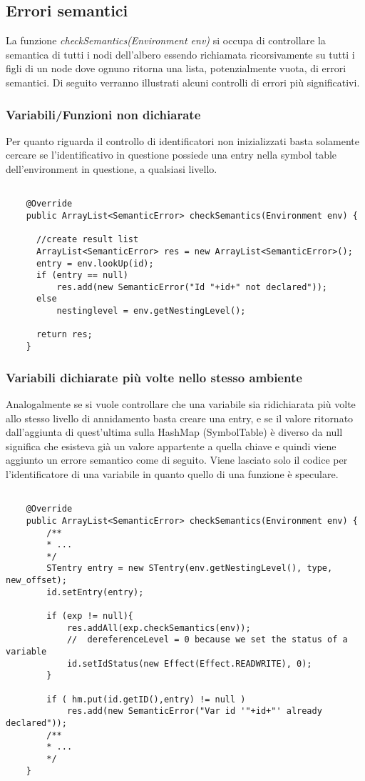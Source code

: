 \documentclass[../../main]{subfiles}
\begin{document}
\subsection{Errori semantici}
La funzione \textit{checkSemantics(Environment env)} si occupa di controllare la semantica di tutti i nodi dell'albero essendo richiamata 
ricorsivamente su tutti i figli di un node dove ognuno ritorna una lista, potenzialmente vuota, di errori semantici. Di seguito verranno illustrati
alcuni controlli di errori più significativi.

  \subsubsection{Variabili/Funzioni non dichiarate}
  Per quanto riguarda il controllo di identificatori non inizializzati basta solamente cercare se l'identificativo in questione possiede una entry
  nella symbol table dell'environment in questione, a qualsiasi livello.
  \newpage
  \begin{lstlisting}[style=java]
      
    @Override
	public ArrayList<SemanticError> checkSemantics(Environment env) {
	  
	  //create result list
	  ArrayList<SemanticError> res = new ArrayList<SemanticError>();
      entry = env.lookUp(id);
      if (entry == null)
          res.add(new SemanticError("Id "+id+" not declared"));
      else
          nestinglevel = env.getNestingLevel();

	  return res;
	}
  \end{lstlisting}
  \subsubsection{Variabili dichiarate più volte nello stesso ambiente}
  Analogalmente se si vuole controllare che una variabile sia ridichiarata più volte allo stesso livello di annidamento basta creare una entry, e se 
  il valore ritornato dall'aggiunta di quest'ultima sulla HashMap (SymbolTable) è diverso da null significa che esisteva già un valore appartente
  a quella chiave e quindi viene aggiunto un errore semantico come di seguito. Viene lasciato solo il codice per l'identificatore di una variabile in quanto quello di una funzione è speculare.
  \begin{lstlisting}[style=java]
      
    @Override
    public ArrayList<SemanticError> checkSemantics(Environment env) {
        /**
        * ...
        */
        STentry entry = new STentry(env.getNestingLevel(), type, new_offset);
        id.setEntry(entry);

        if (exp != null){
            res.addAll(exp.checkSemantics(env));
            //  dereferenceLevel = 0 because we set the status of a variable
            id.setIdStatus(new Effect(Effect.READWRITE), 0);
        }

        if ( hm.put(id.getID(),entry) != null )
            res.add(new SemanticError("Var id '"+id+"' already declared"));
        /**
        * ...
        */
    }
  \end{lstlisting}
\end{document}
